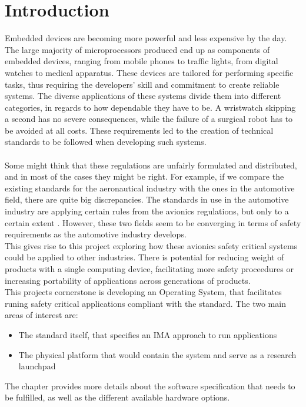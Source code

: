 \chapter{Introduction}\label{ch:introduction} 

Embedded devices are becoming more powerful and less expensive by the day. The large majority of
microprocessors produced end up as components of embedded devices, ranging from mobile phones
to traffic lights, from digital watches to medical apparatus. These devices are tailored for 
performing specific tasks, thus requiring the developers' skill and commitment to create reliable
systems. The diverse applications of these systems divide them into different categories, in regards to
how dependable they have to be. A wristwatch skipping a second has no severe consequences, while the
failure of a surgical robot has to be avoided at all costs. These requirements led to the creation 
of technical standards to be followed when developing such systems. 
\\\\
Some might think that these regulations are unfairly formulated and distributed, and in most
of the cases they might be right. For example, if we compare the existing standards for the aeronautical industry with the ones in the automotive field, there are quite big discrepancies. The standards 
in use in the automotive industry are applying certain rules from the avionics regulations, 
but only to a certain extent
\cite {can_cars_fly}.
However, these two fields seem to be converging in terms of safety requirements as the automotive industry develops.
\\
This gives rise to this project exploring how these avionics safety critical systems could be applied to other industries.
There is potential for reducing weight of products with a single computing device,
facilitating more safety proceedures
or increasing portability of applications across generations of products.
\\
This project\textquotesingle s cornerstone is developing an Operating System, that facilitates runing safety critical applications compliant with the \arinc{} standard. 
The two main areas of interest are:
\\
\begin{itemize}
\item The standard itself, that specifies an IMA approach to run applications
\item The physical platform that would contain the system and serve as a research launchpad
\end{itemize}
The  chapter provides more details about the software specification that needs to be fulfilled,
as well as the different available hardware options.